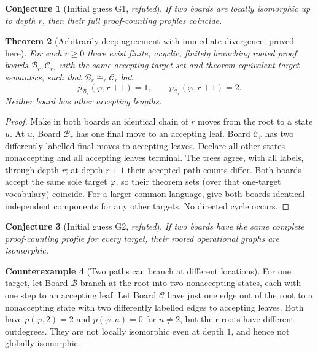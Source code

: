 \documentclass[11pt,letterpaper]{article}
\newtheorem{theorem}{Theorem}[section]
\newtheorem{conjecture}[theorem]{Conjecture}
\theoremstyle{definition}
\newtheorem{counterexample}[theorem]{Counterexample}
\newcommand{\B}{\mathcal B}
\begin{document}
\begin{conjecture}[Initial guess G1, \emph{refuted}]
If two boards are locally isomorphic up to depth $r$, then their full proof-counting profiles coincide.
\end{conjecture}
\begin{theorem}[Arbitrarily deep agreement with immediate divergence; proved here]\label{thm:late}
For each $r\ge0$ there exist finite, acyclic, finitely branching rooted proof boards $\B_r,\mathcal C_r$, with the same accepting target set and theorem-equivalent target semantics, such that $\B_r\cong_r\mathcal C_r$ but
\[
p_{\B_r}(\varphi,r+1)=1,\qquad p_{\mathcal C_r}(\varphi,r+1)=2.
\]
Neither board has other accepting lengths.
\end{theorem}
\begin{proof}
Make in both boards an identical chain of $r$ moves from the root to a state $u$. At $u$, Board $\B_r$ has one final move to an accepting leaf. Board $\mathcal C_r$ has two differently labelled final moves to accepting leaves. Declare all other states nonaccepting and all accepting leaves terminal. The trees agree, with all labels, through depth $r$; at depth $r+1$ their accepted path counts differ. Both boards accept the same sole target $\varphi$, so their theorem sets (over that one-target vocabulary) coincide. For a larger common language, give both boards identical independent components for any other targets. No directed cycle occurs.
\end{proof}

\begin{conjecture}[Initial guess G2, \emph{refuted}]
If two boards have the same complete proof-counting profile for every target, their rooted operational graphs are isomorphic.
\end{conjecture}
\begin{counterexample}[Two paths can branch at different locations]\label{ce:profile}
For one target, let Board $\B$ branch at the root into two nonaccepting states, each with one step to an accepting leaf. Let Board $\mathcal C$ have just one edge out of the root to a nonaccepting state with two differently labelled edges to accepting leaves. Both have $p(\varphi,2)=2$ and $p(\varphi,n)=0$ for $n\ne2$, but their roots have different outdegrees. They are not locally isomorphic even at depth $1$, and hence not globally isomorphic.
\end{counterexample}
\end{document}
